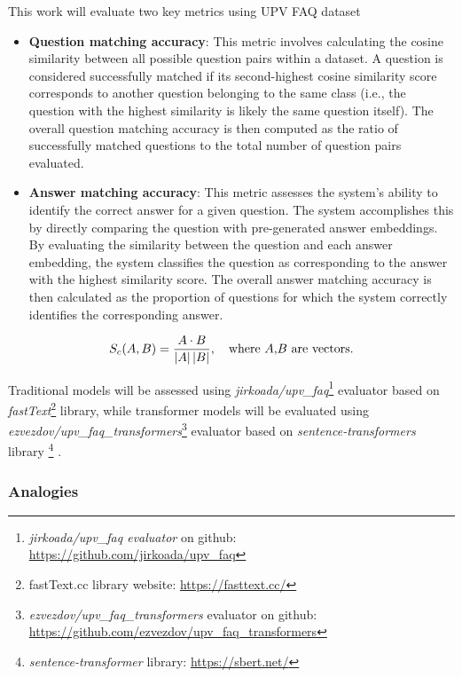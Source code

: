 This work will evaluate two key metrics using UPV FAQ dataset
\begin{itemize}
  \item \textbf{Question matching accuracy}:
    This metric involves calculating the cosine similarity  between all possible question pairs within a dataset.
    A question is considered successfully matched if its second-highest cosine similarity score corresponds to another question belonging to the same class (i.e., the question with the highest similarity is likely the same question itself). 
    The overall question matching accuracy is then computed as the ratio of successfully matched questions to the total number of question pairs evaluated.  
  \item \textbf{Answer matching accuracy}:
    This metric assesses the system's ability to identify the correct answer for a given question.
    The system accomplishes this by directly comparing the question with pre-generated answer embeddings.
    By evaluating the similarity  between the question and each answer embedding, the system classifies the question as corresponding to the answer with the highest similarity score.
    The overall answer matching accuracy is then calculated as the proportion of questions for which the system correctly identifies the corresponding answer.  
\end{itemize}

\begin{equation}
  S_c(A,B) = {{A \cdot B} \over {\left\lvert A\right\rvert \left\lvert B\right\rvert}}, \quad \text{where $A$,$B$ are vectors.}
  \label{eq:cosine_similarity}
\end{equation}

Traditional models will be assessed using \textit{jirkoada/upv\_faq}\footnote{\textit{jirkoada/upv\_faq evaluator} on github: \url{https://github.com/jirkoada/upv_faq}} evaluator based on \textit{fastText}\footnote{\label{footnote:fasttex_lib}fastText.cc library website: \url{https://fasttext.cc/}} library,
while transformer models will be evaluated using \textit{ezvezdov/upv\_faq\_transformers}\footnote{\textit{ezvezdov/upv\_faq\_transformers} evaluator on github: \url{https://github.com/ezvezdov/upv_faq_transformers}} evaluator based on \textit{sentence-transformers} library \footnote{\textit{sentence-transformer} library: \url{https://sbert.net/}} \cite{reimers2019sentencebert}.


\subsubsection{Analogies}

